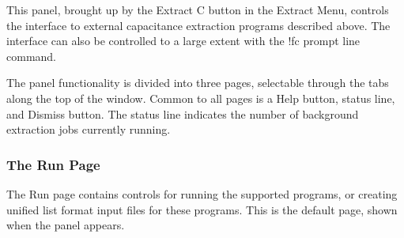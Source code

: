 This panel, brought up by the {\cb Extract C} button in the {\cb
Extract Menu}, controls the interface to external capacitance
extraction programs described above.  The interface can also be
controlled to a large extent with the {\cb !fc} prompt line command.

The panel functionality is divided into three pages, selectable
through the tabs along the top of the window.  Common to all pages is
a {\cb Help} button, status line, and {\cb Dismiss} button.  The
status line indicates the number of background extraction jobs
currently running.

\subsubsection{The Run Page}

The {\cb Run} page contains controls for running the supported
programs, or creating unified list format input files for these
programs.  This is the default page, shown when the panel appears.

